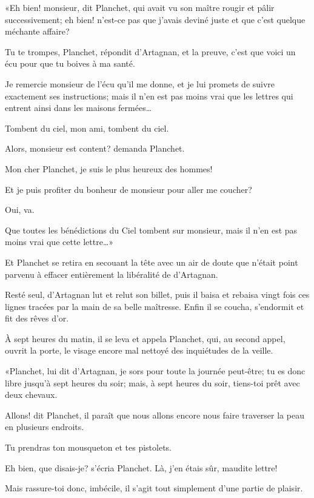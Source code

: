«Eh bien! monsieur, dit Planchet, qui avait vu son maître rougir et pâlir successivement; eh bien! n'est-ce pas que j'avais deviné juste et que c'est quelque méchante affaire? 

\speak  Tu te trompes, Planchet, répondit d'Artagnan, et la preuve, c'est que voici un écu pour que tu boives à ma santé. 

\speak  Je remercie monsieur de l'écu qu'il me donne, et je lui promets de suivre exactement ses instructions; mais il n'en est pas moins vrai que les lettres qui entrent ainsi dans les maisons fermées\dots 

\speak  Tombent du ciel, mon ami, tombent du ciel. 

\speak  Alors, monsieur est content? demanda Planchet. 

\speak  Mon cher Planchet, je suis le plus heureux des hommes! 

\speak  Et je puis profiter du bonheur de monsieur pour aller me coucher? 

\speak  Oui, va. 

\speak  Que toutes les bénédictions du Ciel tombent sur monsieur, mais il n'en est pas moins vrai que cette lettre\dots» 

Et Planchet se retira en secouant la tête avec un air de doute que n'était point parvenu à effacer entièrement la libéralité de d'Artagnan. 

Resté seul, d'Artagnan lut et relut son billet, puis il baisa et rebaisa vingt fois ces lignes tracées par la main de sa belle maîtresse. Enfin il se coucha, s'endormit et fit des rêves d'or. 

À sept heures du matin, il se leva et appela Planchet, qui, au second appel, ouvrit la porte, le visage encore mal nettoyé des inquiétudes de la veille. 

«Planchet, lui dit d'Artagnan, je sors pour toute la journée peut-être; tu es donc libre jusqu'à sept heures du soir; mais, à sept heures du soir, tiens-toi prêt avec deux chevaux. 

\speak  Allons! dit Planchet, il paraît que nous allons encore nous faire traverser la peau en plusieurs endroits. 

\speak  Tu prendras ton mousqueton et tes pistolets. 

\speak  Eh bien, que disais-je? s'écria Planchet. Là, j'en étais sûr, maudite lettre! 

\speak  Mais rassure-toi donc, imbécile, il s'agit tout simplement d'une partie de plaisir. 

